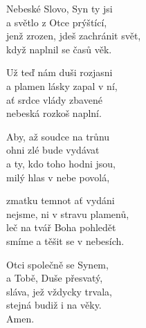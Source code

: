 \begin{translatioMulticol}{5}
Nebeské Slovo, Syn ty jsi\\
a světlo z Otce prýštící,\\
jenž zrozen, jdeš zachránit svět,\\
když naplnil se časů věk.\columnbreak

Už teď nám duši rozjasni\\
a plamen lásky zapal v ní,\\
ať srdce vlády zbavené\\
nebeská rozkoš naplní.\columnbreak

Aby, až soudce na trůnu\\
ohni zlé bude vydávat\\
a ty, kdo toho hodni jsou,\\
milý hlas v nebe povolá,\columnbreak

zmatku temnot ať vydáni\\
nejsme, ni v stravu plamenů,\\
leč na tvář Boha pohledět\\
smíme a těšit se v nebesích.\columnbreak

Otci společně se Synem,\\
a Tobě, Duše přesvatý,\\
sláva, jež vždycky trvala,\\
stejná budiž i na věky.\\
Amen.
\end{translatioMulticol}
